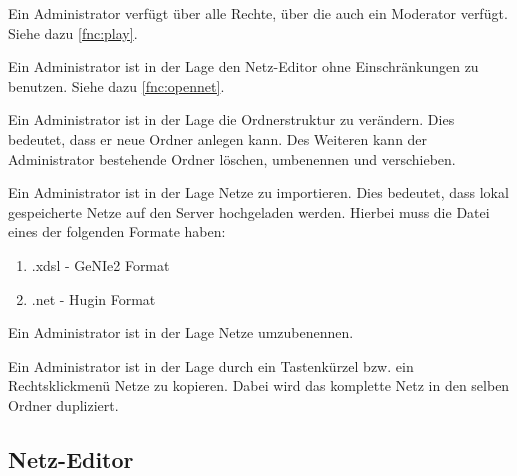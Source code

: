 \documentclass[parskip=full,11pt,twoside]{scrartcl}
\begin{document}

Ein Administrator verfügt über alle Rechte, über die auch ein Moderator verfügt. Siehe dazu \ref{fnc:play}.


Ein Administrator ist in der Lage den Netz-Editor ohne Einschränkungen zu benutzen. Siehe dazu \ref{fnc:opennet}.


Ein Administrator ist in der Lage die Ordnerstruktur zu verändern. Dies bedeutet, dass er neue Ordner anlegen kann. Des Weiteren kann der Administrator bestehende Ordner löschen, umbenennen und verschieben.  


Ein Administrator ist in der Lage Netze zu importieren. Dies bedeutet, dass lokal gespeicherte Netze auf den Server hochgeladen werden. Hierbei muss die Datei eines der folgenden Formate haben:
\begin{enumerate}
    \item .xdsl - GeNIe2 Format
    \item .net - Hugin Format %
\end{enumerate}

Ein Administrator ist in der Lage Netze umzubenennen. 



Ein Administrator ist in der Lage durch ein Tastenkürzel bzw. ein Rechtsklickmenü Netze zu kopieren. Dabei wird das komplette Netz in den selben Ordner dupliziert.

\subsection{Netz-Editor}
\end{document}
